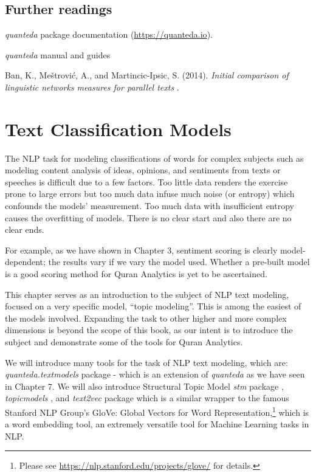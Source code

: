 \documentclass[
]{article}
\begin{document}
\hypertarget{further-readings-6}{%
\subsection{Further readings}\label{further-readings-6}}

\emph{quanteda} package documentation (\url{https://quanteda.io}).

\emph{quanteda} manual and guides \citep{quanteda}

Ban, K., Meštrović, A., and Martincic-Ipsic, S. (2014). \emph{Initial comparison of linguistic networks measures for parallel texts} \citep{ban2014}.

\hypertarget{text-classification-models}{%
\section{Text Classification Models}\label{text-classification-models}}

The NLP task for modeling classifications of words for complex subjects such as modeling content analysis of ideas, opinions, and sentiments from texts or speeches is difficult due to a few factors. Too little data renders the exercise prone to large errors but too much data infuse much noise (or entropy) which confounds the models' measurement. Too much data with insufficient entropy causes the overfitting of models. There is no clear start and also there are no clear ends.

For example, as we have shown in Chapter 3, sentiment scoring is clearly model-dependent; the results vary if we vary the model used. Whether a pre-built model is a good scoring method for Quran Analytics is yet to be ascertained.

This chapter serves as an introduction to the subject of NLP text modeling, focused on a very specific model, ``topic modeling''. This is among the easiest of the models involved. Expanding the task to other higher and more complex dimensions is beyond the scope of this book, as our intent is to introduce the subject and demonstrate some of the tools for Quran Analytics.

We will introduce many tools for the task of NLP text modeling, which are: \emph{quanteda.textmodels} \citep{quantedatextmodels} package - which is an extension of \emph{quanteda} as we have seen in Chapter 7. We will also introduce Structural Topic Model \emph{stm} package \citep{stm}, \emph{topicmodels} \citep{topicmodels}, and \emph{text2vec} \citep{text2vec} package which is a similar wrapper to the famous Stanford NLP Group's GloVe: Global Vectors for Word Representation,\footnote{Please see \url{https://nlp.stanford.edu/projects/glove/} for details.} which is a word embedding tool, an extremely versatile tool for Machine Learning tasks in NLP.
\end{document}

